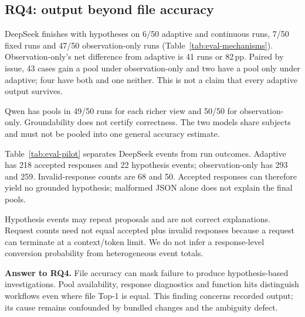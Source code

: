 \subsection{RQ4: output beyond file accuracy}\label{sec:rq4}
DeepSeek finishes with hypotheses on 6/50 adaptive and continuous runs, 7/50 fixed runs and 47/50 observation-only runs (Table~\ref{tab:eval-mechanisms}). Observation-only's net difference from adaptive is 41 runs or 82\,pp. Paired by issue, 43 cases gain a pool under observation-only and two have a pool only under adaptive; four have both and one neither. This is not a claim that every adaptive output survives.

Qwen has pools in 49/50 runs for each richer view and 50/50 for observation-only. Groundability does not certify correctness. The two models share subjects and must not be pooled into one general accuracy estimate.

Table~\ref{tab:eval-pilot} separates DeepSeek events from run outcomes. Adaptive has 218 accepted responses and 22 hypothesis events; observation-only has 293 and 259. Invalid-response counts are 68 and 50. Accepted responses can therefore yield no grounded hypothesis; malformed JSON alone does not explain the final pools.


Hypothesis events may repeat proposals and are not correct explanations. Request counts need not equal accepted plus invalid responses because a request can terminate at a context/token limit. We do not infer a response-level conversion probability from heterogeneous event totals.

\noindent\textbf{Answer to RQ4.} File accuracy can mask failure to produce hypothesis-based investigations. Pool availability, response diagnostics and function hits distinguish workflows even where file Top-1 is equal. This finding concerns recorded output; its cause remains confounded by bundled changes and the ambiguity defect.

